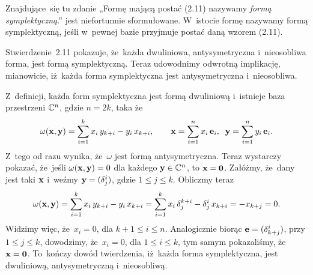 \documentclass[a4paper,11pt]{article}
\begin{document}
\vspace{\spaceFour}





\start {} Znajdujące~się tu zdanie „Formę mającą postać (2.11)
nazywamy \textit{formą symplektyczną}.” jest niefortunnie sformułowane.
W~istocie formę nazywamy formą symplektyczną, jeśli w~pewnej bazie
przyjmuje postać daną wzorem (2.11).

Stwierdzenie~2.11 pokazuje, że~każda dwuliniowa, antysymetryczna
i~nieosobliwa forma, jest formą symplektyczną. Teraz udowodnimy odwrotną
implikację, mianowicie, iż~każda forma symplektyczna jest antysymetryczna
i~nieosobliwa.

Z~definicji, każda form symplektyczna jest formą dwuliniową i~istnieje baza
przestrzeni $\mathbb{C}^{ n }$, gdzie $n = 2k$, taka że
\begin{equation}
  \label{eq:Wojtynski-26}
  \omega( \mathbf{x}, \mathbf{y} ) =
  \sum_{ i = 1 }^{ k } x_{ i } \, y_{ k + i } - y_{ i } \, x_{ k + i }, \qquad
  \mathbf{x} = \sum_{ i = 1 }^{ n } x_{ i } \, \mathbf{e}_{ i }, \;\;
  \mathbf{y} = \sum_{ i = 1 }^{ n } y_{ i } \, \mathbf{e}_{ i }.
\end{equation}
Z~tego od razu wynika, że~$\omega$ jest formą antysymetryczna. Teraz wystarczy
pokazać, że~jeśli $\omega( \mathbf{x}, \mathbf{y} ) = 0$ dla każdego
$\mathbf{y} \in \mathbb{C}^{ n }$, to $\mathbf{x} = \mathbf{0}$. Załóżmy, że~dany
jest taki $\mathbf{x}$ i~weźmy $\mathbf{y} = ( \delta^{ i }_{ j } )$, gdzie
$1 \leq j \leq k$. Obliczmy teraz
\begin{equation}
  \label{eq:Wojtynski-27}
  \omega( \mathbf{x}, \mathbf{y} ) =
  \sum_{ i = 1 }^{ k } x_{ i } \, y_{ k + i } - y_{ i } \, x_{ k + i } =
  \sum_{ i = 1 }^{ k } x_{ i } \, \delta^{ k + i }_{ j } - \delta^{ i }_{ j } \, x_{ k + i } =
  -x_{ k + j } = 0.
\end{equation}
Widzimy więc, że~$x_{ i } = 0$, dla $k + 1 \leq i \leq n$. Analogicznie biorąc
$\mathbf{e} = ( \delta^{ i }_{ k + j } )$, przy $1 \leq j \leq k$, dowodzimy,
że~$x_{ i } = 0$, dla $1 \leq i \leq k$, tym samym pokazaliśmy,
że~$\mathbf{x} = \mathbf{0}$. To~kończy dowód twierdzenia, iż~każda forma
symplektyczna, jest dwuliniową, antysymetryczną i~nieosobliwą.

\vspace{\spaceFour}
\end{document}
